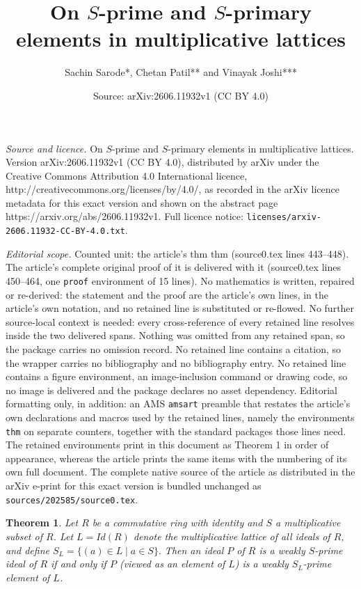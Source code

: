 \documentclass[10pt,a4paper]{amsart}
\title{On $S$-prime and $S$-primary elements in multiplicative lattices}
\author{Sachin Sarode*, Chetan Patil** and Vinayak Joshi***}
\date{Source: arXiv:2606.11932v1 (CC BY 4.0)}
\newtheorem{thm}{Theorem}
\begin{document}
\maketitle

\noindent\emph{Source and licence.} On $S$-prime and $S$-primary elements in multiplicative lattices. Version arXiv:2606.11932v1 (CC BY 4.0), distributed by arXiv under the Creative Commons Attribution 4.0 International licence, http://creativecommons.org/licenses/by/4.0/, as recorded in the arXiv licence metadata for this exact version and shown on the abstract page https://arxiv.org/abs/2606.11932v1. Full licence notice: \texttt{licenses/arxiv-2606.11932-CC-BY-4.0.txt}.\par\smallskip

\noindent\textit{Editorial scope.} Counted unit: the article's thm thm (source0.tex lines 443--448). The article's complete original proof of it is delivered with it (source0.tex lines 450--464, one \texttt{proof} environment of 15 lines). No mathematics is written, repaired or re-derived: the statement and the proof are the article's own lines, in the article's own notation, and no retained line is substituted or re-flowed.  No further source-local context is needed: every cross-reference of every retained line resolves inside the two delivered spans.  Nothing was omitted from any retained span, so the package carries no omission record.  No retained line contains a citation, so the wrapper carries no bibliography and no bibliography entry.  No retained line contains a figure environment, an image-inclusion command or drawing code, so no image is delivered and the package declares no asset dependency.  Editorial formatting only, in addition: an AMS \texttt{amsart} preamble that restates the article's own declarations and macros used by the retained lines, namely the environments \texttt{thm} on separate counters, together with the standard packages those lines need.  The retained environments print in this document as Theorem 1 in order of appearance, whereas the article prints the same items with the numbering of its own full document.  The complete native source of the article as distributed in the arXiv e-print for this exact version is bundled unchanged as \texttt{sources/202585/source0.tex}.
\begin{thm}%
	Let $R$ be a commutative ring with identity and $S$ a multiplicative subset of $R$. 
	Let $L=Id(R)$ denote the multiplicative lattice of all ideals of $R$, and define 
	$S_L=\{(a)\in L \mid a\in S\}.$
	Then an ideal $P$ of $R$ is a weakly $S$-prime ideal of $R$ if and only if $P$ (viewed as an element of $L$) is a weakly $S_L$-prime element of $L$.
\end{thm}
\end{document}
